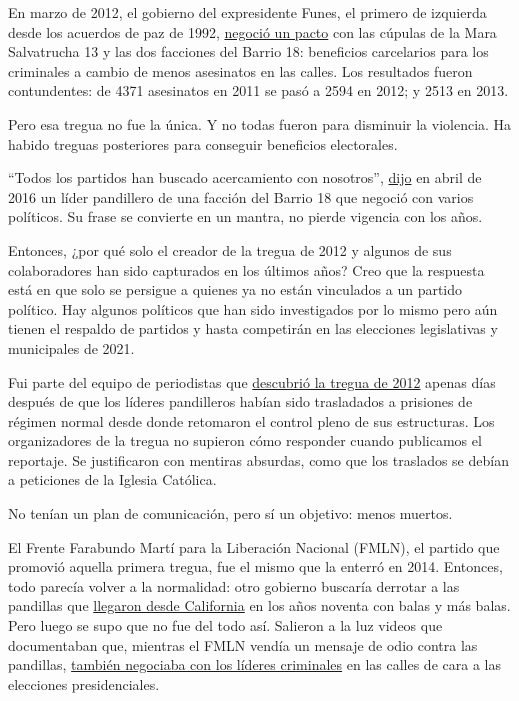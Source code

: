 En marzo de 2012, el gobierno del expresidente Funes, el primero de
izquierda desde los acuerdos de paz de 1992,
\href{https://www.elfaro.net/es/201203/noticias/7985/}{negoció un pacto}
con las cúpulas de la Mara Salvatrucha 13 y las dos facciones del Barrio
18: beneficios carcelarios para los criminales a cambio de menos
asesinatos en las calles. Los resultados fueron contundentes: de 4371
asesinatos en 2011 se pasó a 2594 en 2012; y 2513 en 2013.

Pero esa tregua no fue la única. Y no todas fueron para disminuir la
violencia. Ha habido treguas posteriores para conseguir beneficios
electorales.

``Todos los partidos han buscado acercamiento con nosotros'',
\href{https://elfaro.net/es/201604/salanegra/18347/\%E2\%80\%9CTodos-los-partidos-han-buscado-acercamientos-con-nosotros\%E2\%80\%9D.htm}{dijo}
en abril de 2016 un líder pandillero de una facción del Barrio 18 que
negoció con varios políticos. Su frase se convierte en un mantra, no
pierde vigencia con los años.

Entonces, ¿por qué solo el creador de la tregua de 2012 y algunos de sus
colaboradores han sido capturados en los últimos años? Creo que la
respuesta está en que solo se persigue a quienes ya no están vinculados
a un partido político. Hay algunos políticos que han sido investigados
por lo mismo pero aún tienen el respaldo de partidos y hasta competirán
en las elecciones legislativas y municipales de 2021.

Fui parte del equipo de periodistas que
\href{http://www.salanegra.elfaro.net/es/201209/cronicas/9612/La-nueva-verdad-sobre-la-Tregua-entre-pandillas.htm}{descubrió
la tregua de 2012} apenas días después de que los líderes pandilleros
habían sido trasladados a prisiones de régimen normal desde donde
retomaron el control pleno de sus estructuras. Los organizadores de la
tregua no supieron cómo responder cuando publicamos el reportaje. Se
justificaron con mentiras absurdas, como que los traslados se debían a
peticiones de la Iglesia Católica.

No tenían un plan de comunicación, pero sí un objetivo: menos muertos.

El Frente Farabundo Martí para la Liberación Nacional (FMLN), el partido
que promovió aquella primera tregua, fue el mismo que la enterró en
2014. Entonces, todo parecía volver a la normalidad: otro gobierno
buscaría derrotar a las pandillas que
\href{https://www.nytimes.com/es/2018/02/18/espanol/opinion/opinion-martinez-mara-ms-13-trump.html}{llegaron
desde California} en los años noventa con balas y más balas. Pero luego
se supo que no fue del todo así. Salieron a la luz videos que
documentaban que, mientras el FMLN vendía un mensaje de odio contra las
pandillas,
\href{https://elfaro.net/es/206005/salanegra/18560/El-FMLN-hizo-alianza-con-las-pandillas-para-la-elecci\%C3\%B3n-presidencial-de-2014.htm}{también
negociaba con los líderes criminales} en las calles de cara a las
elecciones presidenciales.

